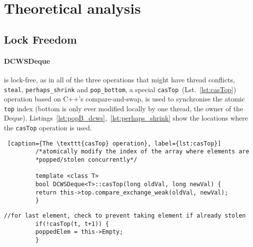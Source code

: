 \documentclass [10pt]{scrartcl}
\begin{document}
   
   \section{Theoretical analysis}
   
   \subsection{Lock Freedom}
   
   \paragraph{DCWSDeque}is lock-free, as in all of the three operations that might have thread conflicts, \texttt{steal}, \texttt{perhaps\_shrink} and \texttt{pop\_bottom}, a special \texttt{casTop}~(Lst.~\ref{lst:casTop}) operation based on C++'s compare-and-swap, is used to synchronise the atomic \texttt{top} index (bottom is only ever modified locally by one thread, the owner of the Deque). Listings~\ref{lst:popB_dcws},~\ref{lst:perhaps_shrink} show the locations where the \texttt{casTop} operation is used.
   
   \begin{center}
      \begin{minipage}{.9\textwidth}
         \begin{lstlisting} [caption={The \texttt{casTop} operation}, label={lst:casTop}]
         /*atomically modify the index of the array where elements are 
         *popped/stolen concurrently*/
         
         template <class T>
         bool DCWSDeque<T>::casTop(long oldVal, long newVal) {
         return this->top.compare_exchange_weak(oldVal, newVal);
         }
         \end{lstlisting}
      \end{minipage}
   \end{center}
   
   \begin{center}
      \begin{minipage}{.9\textwidth}
         \begin{lstlisting}[caption={\texttt{popBottom} resolves conflict on concurrent \texttt{steal} and  \texttt{popBottom} (same as in \texttt{steal})}, label={lst:popB_dcws}]
         //for last element, check to prevent taking element if already stolen
         if(!casTop(t, t+1)) {
         poppedElem = this->Empty;
         }
         \end{lstlisting}
      \end{minipage}
   \end{center}
   
\end{document}
